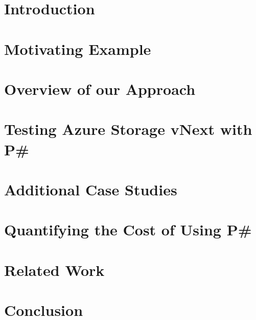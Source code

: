\documentclass[letterpaper,twocolumn,10pt]{article}
\newcommand{\psharp}{P\#\xspace}
\newcommand{\Azure}{Azure\xspace}
\begin{document}
\section{Introduction}
\label{sec:intro}



\section{Motivating Example}
\label{sec:motivation}



\section{Overview of our Approach}
\label{sec:overview}



\section{Testing \Azure Storage vNext with \psharp}
\label{sec:method}



\section{Additional Case Studies}
\label{sec:cases}



\section{Quantifying the Cost of Using \psharp}
\label{sec:eval}



\section{Related Work}
\label{sec:rw}



\section{Conclusion}
\label{sec:conclusion}





\balance

{\footnotesize 
}
\end{document}
